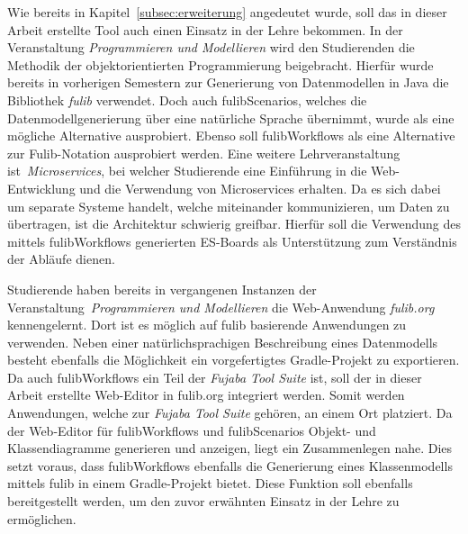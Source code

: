 Wie bereits in Kapitel~\ref{subsec:erweiterung} angedeutet wurde, soll das in dieser Arbeit erstellte Tool auch einen Einsatz in der Lehre bekommen.
In der Veranstaltung \textit{Programmieren und Modellieren} wird den Studierenden die Methodik der objektorientierten Programmierung beigebracht.
Hierfür wurde bereits in vorherigen Semestern zur Generierung von Datenmodellen in Java die Bibliothek \textit{fulib} verwendet.
Doch auch fulibScenarios, welches die Datenmodellgenerierung über eine natürliche Sprache übernimmt, wurde als eine mögliche Alternative ausprobiert.
Ebenso soll fulibWorkflows als eine Alternative zur Fulib-Notation ausprobiert werden.
Eine weitere Lehrveranstaltung ist~\textit{Microservices}, bei welcher Studierende eine Einführung in die Web-Entwicklung und die Verwendung von
Microservices erhalten.
Da es sich dabei um separate Systeme handelt, welche miteinander kommunizieren, um Daten zu übertragen, ist die Architektur schwierig greifbar.
Hierfür soll die Verwendung des mittels fulibWorkflows generierten \ac{ES}-Boards als Unterstützung zum Verständnis der Abläufe dienen.

Studierende haben bereits in vergangenen Instanzen der Veranstaltung~\textit{Programmieren und Modellieren} die Web-Anwendung \textit{fulib.org} kennengelernt.
Dort ist es möglich auf fulib basierende Anwendungen zu verwenden.
Neben einer natürlichsprachigen Beschreibung eines Datenmodells besteht ebenfalls die Möglichkeit ein vorgefertigtes Gradle-Projekt zu exportieren.
Da auch fulibWorkflows ein Teil der \textit{Fujaba Tool Suite} ist, soll der in dieser Arbeit erstellte Web-Editor in fulib.org integriert werden.
Somit werden Anwendungen, welche zur \textit{Fujaba Tool Suite} gehören, an einem Ort platziert.
Da der Web-Editor für fulibWorkflows und fulibScenarios Objekt- und Klassendiagramme generieren und anzeigen, liegt ein Zusammenlegen nahe.
Dies setzt voraus, dass fulibWorkflows ebenfalls die Generierung eines Klassenmodells mittels fulib in einem Gradle-Projekt bietet.
Diese Funktion soll ebenfalls bereitgestellt werden, um den zuvor erwähnten Einsatz in der Lehre zu ermöglichen.
